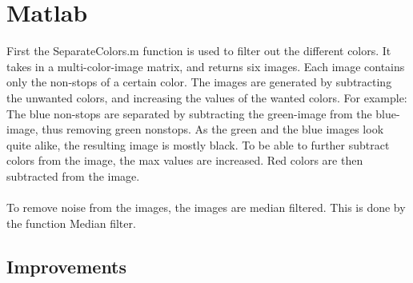 \lstset{language=Matlab}
\lstset{frame=single}
\section{Matlab}
First the SeparateColors.m function is used to filter out the different colors. It takes in a multi-color-image matrix, and returns six images. Each image contains only the non-stops of a certain color. The images are generated by subtracting the unwanted colors, and increasing the values of the wanted colors.
For example: The blue non-stops are separated by subtracting the green-image from the blue-image, thus removing green nonstops. As the green and the blue images look quite alike, the resulting image is mostly black. To be able to further subtract colors from the image, the max values are increased. Red colors are then subtracted from the image.
\\

\\
To remove noise from the images, the images are median filtered. This is done by the function Median filter. 
\subsection{Improvements}



